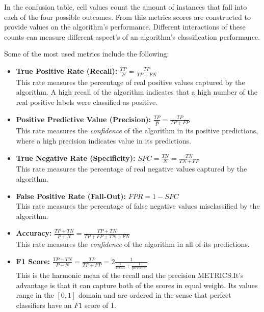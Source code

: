 In the confusion table, cell values count the amount of instances that fall into each of the four possible outcomes.
From this metrics scores are constructed to provide values on the algorithm's performance.
Different interactions of these counts can measure different aspect's of an algorithm's classification performance.

Some of the most used metrics include the following:

\begin{itemize}
\item \textbf{True Positive Rate (Recall):} $\frac{TP}{P} = \frac{TP}{TP + FN}$ \\ This rate measures the percentage of real positive values captured by the algorithm.
A high recall of the algorithm indicates that a high number of the real positive labels were classified as positive.


\item \textbf{Positive Predictive Value (Precision):} $\frac{TP}{\hat{P}} = \frac{TP}{TP + FP}$ \\ This rate measures the \textit{confidence} of the algorithm in its positive predictions, where a high precision indicates value in its predictions.

\item \textbf{True Negative Rate (Specificity):} $ SPC = \frac{TN}{N} = \frac{TN}{TN + FP}$ \\ This rate measures the percentage of real negative values captured by the algorithm.


\item \textbf{False Positive Rate (Fall-Out):} $FPR = 1 - SPC$ \\ This rate measures the percentage of false negative values misclassified by the algorithm.

\item \textbf{Accuracy:} $\frac{TP + TN}{P + N} = \frac{TP + TN}{TP + FP + TN + FN}$ \\ This rate measures the \textit{confidence} of the algorithm in all of its predictions.


\item \textbf{F1 Score:} $\frac{TP + TN}{P + N} = \frac{TP}{TP + FP} = 2 \frac{1}{ \frac{1}{recall} + \frac{1}{precision} }$ \\ This is the harmonic mean of the recall and the precision METRICS.\@ It's advantage is that it can capture both of the scores in equal weight.
Its values range in the ${[0,1 ]}$ domain and are ordered in the sense that perfect classifiers have an $F1$ score of 1.

\end{itemize}


